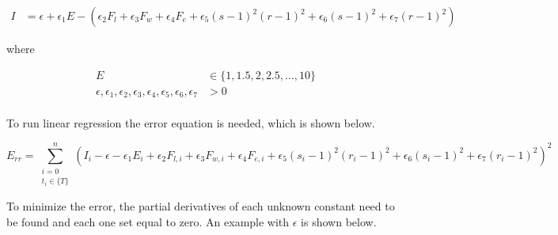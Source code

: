 \begin{minipage}{\textwidth}
	\begin{equation}
		\label{eq:BasicSurfaceEquation}
		\begin{split}
			I & =\epsilon+\epsilon_1 E-\left( 
				\epsilon_2 F_l+\epsilon_3 F_w+\epsilon_4 F_e+\epsilon_5 (s-1)^2(r-1)^2+\epsilon_6 (s-1)^2+\epsilon_7 (r-1)^2
			\right)
		\end{split}
	\end{equation}
	\centerline{where}
	\begin{equation*}
	    \begin{split}
	        E & \in \{ 1,1.5,2,2.5, \dots ,10 \} \\
	        \epsilon, \epsilon_1, \epsilon_2, \epsilon_3, \epsilon_4, \epsilon_5,\epsilon_6,\epsilon_7 & > 0 \\
	    \end{split}
	\end{equation*}
\end{minipage}

To run linear regression the error equation is needed, which is shown below.

\begin{equation*}
    E_{rr}=\sum_{
            \substack{i=0\\ t_i\in \{ T \}}
        }^n \left(
        I_i
        -\epsilon
        -\epsilon_1 E_i
        +\epsilon_2 F_{l,i}
        +\epsilon_3 F_{w,i}
        +\epsilon_4 F_{e,i}
        +\epsilon_5 (s_i-1)^2(r_i-1)^2
        +\epsilon_6 (s_i-1)^2
        +\epsilon_7 (r_i-1)^2
    \right)^2
\end{equation*}

To minimize the error, the partial derivatives of each unknown constant need to be found and each one set equal to zero. An example with $\epsilon$ is shown below.

